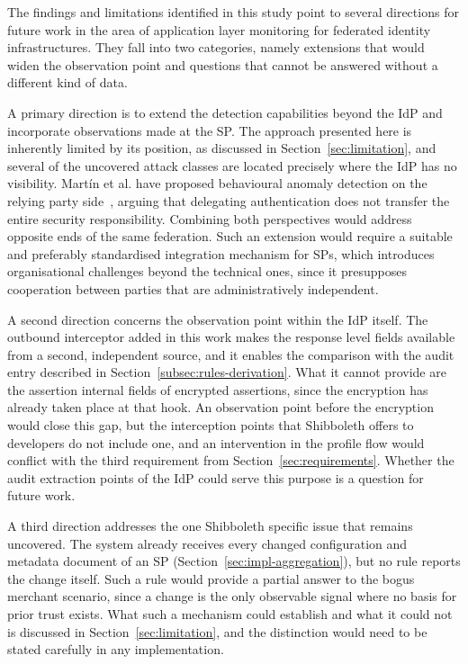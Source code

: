 \documentclass[../main.tex]{subfiles}
\begin{document}
The findings and limitations identified in this study point to several directions for future work 
in the area of application layer monitoring for federated identity infrastructures. 
They fall into two categories, namely extensions that would widen the observation point and 
questions that cannot be answered without a different kind of data.

A primary direction is to extend the detection capabilities beyond the IdP and incorporate 
observations made at the SP. 
The approach presented here is inherently limited by its position, as discussed in 
Section~\ref{sec:limitation}, and several of the uncovered attack classes are located precisely 
where the IdP has no visibility. 
Martín et al. have proposed behavioural anomaly detection on the relying party 
side~\cite{UEBAFederation}, arguing that delegating authentication does not transfer the entire 
security responsibility. 
Combining both perspectives would address opposite ends of the same federation. 
Such an extension would require a suitable and preferably standardised integration mechanism for 
SPs, which introduces organisational challenges beyond the technical ones, since it 
presupposes cooperation between parties that are administratively independent.

A second direction concerns the observation point within the IdP itself. 
The outbound interceptor added in this work makes the response level fields available from a second, 
independent source, and it enables the comparison with the audit entry described in 
Section~\ref{subsec:rules-derivation}. 
What it cannot provide are the assertion internal fields of encrypted assertions, since the 
encryption has already taken place at that hook. 
An observation point before the encryption would close this gap, but the interception points that 
Shibboleth offers to developers do not include one, and an intervention in the profile flow would 
conflict with the third requirement from Section~\ref{sec:requirements}. 
Whether the audit extraction points of the IdP could serve this purpose is a question for future work.

A third direction addresses the one Shibboleth specific issue that remains uncovered. 
The system already receives every changed configuration and metadata document of an SP 
(Section~\ref{sec:impl-aggregation}), but no rule reports the change itself. 
Such a rule would provide a partial answer to the bogus merchant scenario, since a change is the 
only observable signal where no basis for prior trust exists. 
What such a mechanism could establish and what it could not is discussed in 
Section~\ref{sec:limitation}, and the distinction would need to be stated carefully in any 
implementation.
\end{document}
